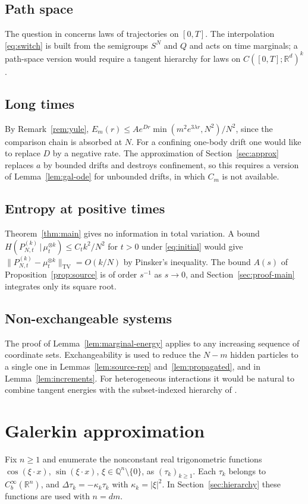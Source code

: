 \documentclass[11pt]{amsart}
\numberwithin{equation}{section}
\theoremstyle{plain}
\theoremstyle{remark}
\newcommand{\R}{\mathbb{R}}
\newcommand{\Q}{\mathbb{Q}}
\begin{document}
\subsection*{Path space}
The question in \cite{Lac23} concerns laws of trajectories on $[0,T]$. The interpolation \eqref{eq:switch} is built from the semigroups $S^N$ and $Q$ and acts on time marginals; a path-space version would require a tangent hierarchy for laws on $C([0,T];\R^d)^k$.

\subsection*{Long times}
By Remark~\ref{rem:yule}, $E_m(r)\le Ae^{Dr}\min(m^2e^{3\lambda r},N^2)/N^2$, since the comparison chain is absorbed at $N$. For a confining one-body drift one would like to replace $D$ by a negative rate. The approximation of Section~\ref{sec:approx} replaces $a$ by bounded drifts and destroys confinement, so this requires a version of Lemma~\ref{lem:gal-ode} for unbounded drifts, in which $C_m$ is not available.

\subsection*{Entropy at positive times}
Theorem~\ref{thm:main} gives no information in total variation. A bound $H(P^{(k)}_{N,t}\,|\,\mu_t^{\otimes k})\le C_tk^2/N^2$ for $t>0$ under \eqref{eq:initial} would give $\|P^{(k)}_{N,t}-\mu_t^{\otimes k}\|_{\mathrm{TV}}=O(k/N)$ by Pinsker's inequality. The bound $A(s)$ of Proposition~\ref{prop:source} is of order $s^{-1}$ as $s\to0$, and Section~\ref{sec:proof-main} integrates only its square root.

\subsection*{Non-exchangeable systems}
The proof of Lemma~\ref{lem:marginal-energy} applies to any increasing sequence of coordinate sets. Exchangeability is used to reduce the $N-m$ hidden particles to a single one in Lemmas~\ref{lem:source-rep} and~\ref{lem:propagated}, and in Lemma~\ref{lem:increments}. For heterogeneous interactions it would be natural to combine tangent energies with the subset-indexed hierarchy of \cite{LYZ24}.

\appendix
\section{Galerkin approximation}\label{app:galerkin}
Fix $n\ge1$ and enumerate the nonconstant real trigonometric functions $\cos(\xi\cdot x)$, $\sin(\xi\cdot x)$, $\xi\in\Q^n\setminus\{0\}$, as $(\tau_k)_{k\ge1}$. Each $\tau_k$ belongs to $C^\infty_b(\R^n)$, and $\Delta\tau_k=-\kappa_k\tau_k$ with $\kappa_k=|\xi|^2$. In Section~\ref{sec:hierarchy} these functions are used with $n=dm$.
\end{document}

